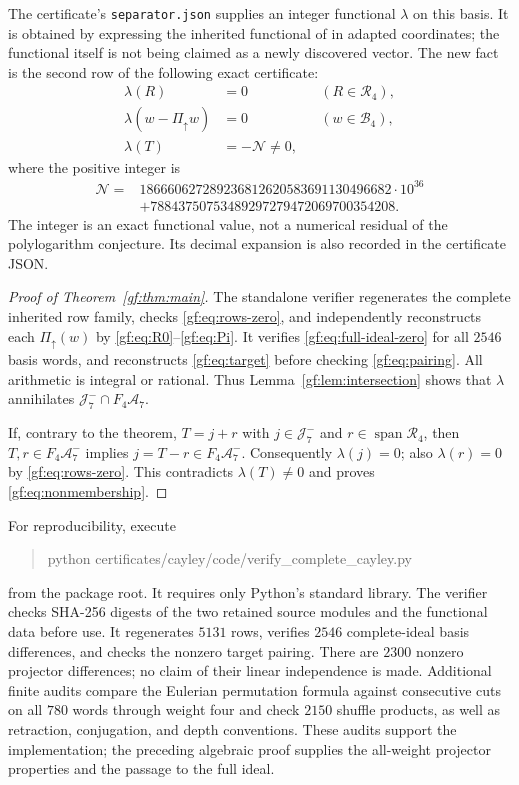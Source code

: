 \documentclass[11pt,a4paper]{article}
\numberwithin{equation}{section}
\theoremstyle{definition}
\theoremstyle{remark}
\begin{document}
The certificate's \texttt{separator.json} supplies an integer functional
$\lambda$ on this basis. It is obtained by expressing the inherited
functional of \cite{gf:Bounded} in adapted coordinates; the functional
itself is not being claimed as a newly discovered vector. The new fact
is the second row of the following exact certificate:
\begin{align}
 \lambda(R)&=0 &&(R\in\mathscr R_4),\label{gf:eq:rows-zero}\\
 \lambda(w-\Pi_{\uparrow}w)&=0 &&(w\in\mathcal B_4),
       \label{gf:eq:full-ideal-zero}\\
 \lambda(T)&=-\mathcal N\ne0,\label{gf:eq:pairing}
\end{align}
where the positive integer is
\[
 \begin{aligned}
 \mathcal N={}&186660627289236812620583691130496682\cdot10^{36}\\
              &+78843750753489297279472069700354208.
 \end{aligned}
\]
The integer is an exact functional value, not a numerical residual of the
polylogarithm conjecture. Its decimal expansion is also recorded in the
certificate JSON.

\begin{proof}[Proof of Theorem~\ref{gf:thm:main}]
The standalone verifier regenerates the complete inherited row family,
checks \eqref{gf:eq:rows-zero}, and independently reconstructs each
$\Pi_{\uparrow}(w)$ by \eqref{gf:eq:R0}--\eqref{gf:eq:Pi}. It verifies
\eqref{gf:eq:full-ideal-zero} for all $2546$ basis words, and reconstructs
\eqref{gf:eq:target} before checking \eqref{gf:eq:pairing}. All arithmetic
is integral or rational. Thus Lemma~\ref{gf:lem:intersection} shows that
$\lambda$ annihilates $\mathcal J_7^-\cap F_4\mathcal A_7$.

If, contrary to the theorem, $T=j+r$ with $j\in\mathcal J_7^-$ and
$r\in\operatorname{span}\mathscr R_4$, then $T,r\in F_4\mathcal A_7^-$
implies $j=T-r\in F_4\mathcal A_7^-$. Consequently $\lambda(j)=0$;
also $\lambda(r)=0$ by \eqref{gf:eq:rows-zero}. This contradicts
$\lambda(T)\ne0$ and proves \eqref{gf:eq:nonmembership}.
\end{proof}

For reproducibility, execute
\begin{quote}\ttfamily
python certificates/cayley/code/verify\_complete\_cayley.py
\end{quote}
from the package root. It requires only Python's
standard library. The verifier checks SHA-256 digests of the two retained
source modules and the functional data before use. It regenerates $5131$
rows, verifies $2546$ complete-ideal basis differences, and checks the
nonzero target pairing. There are $2300$ nonzero projector differences;
no claim of their linear independence is made. Additional finite audits
compare the Eulerian permutation formula against consecutive cuts on all
$780$ words through weight four and check $2150$ shuffle products, as
well as retraction, conjugation, and depth conventions. These audits
support the implementation; the preceding algebraic proof supplies the
all-weight projector properties and the passage to the full ideal.
\end{document}
